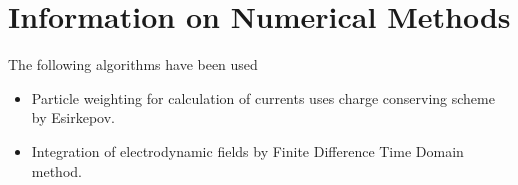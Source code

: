 \documentclass{article}
\begin{document}
\section*{Information on Numerical Methods}
The following algorithms have been used
\begin{itemize}\item Particle weighting for calculation of currents uses charge conserving scheme by Esirkepov.
\cite{Esirkepov2001}
\item Integration of electrodynamic fields by Finite Difference Time Domain method.
\cite{Yee1966}
\end{itemize}


\end{document}

